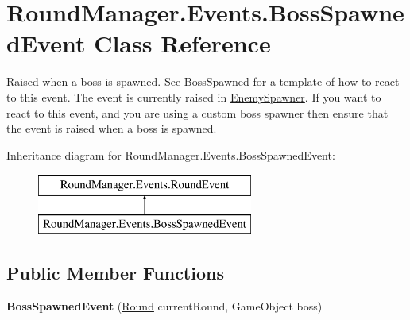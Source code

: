 \hypertarget{class_round_manager_1_1_events_1_1_boss_spawned_event}{}\section{Round\+Manager.\+Events.\+Boss\+Spawned\+Event Class Reference}
\label{class_round_manager_1_1_events_1_1_boss_spawned_event}


Raised when a boss is spawned. See \hyperlink{class_round_manager_1_1_boss_spawned}{Boss\+Spawned} for a template of how to react to this event. The event is currently raised in \hyperlink{class_round_manager_1_1_enemy_spawner}{Enemy\+Spawner}. If you want to react to this event, and you are using a custom boss spawner then ensure that the event is raised when a boss is spawned.  


Inheritance diagram for Round\+Manager.\+Events.\+Boss\+Spawned\+Event\+:\begin{figure}[H]
\begin{center}
\leavevmode
\includegraphics[height=2.000000cm]{class_round_manager_1_1_events_1_1_boss_spawned_event}
\end{center}
\end{figure}
\subsection*{Public Member Functions}
\begin{DoxyCompactItemize}
\item 
\hypertarget{class_round_manager_1_1_events_1_1_boss_spawned_event_a0a7a4896c3de232fdedb5721e7ab0f53}{}{\bfseries Boss\+Spawned\+Event} (\hyperlink{class_round_manager_1_1_round}{Round} current\+Round, Game\+Object boss)\label{class_round_manager_1_1_events_1_1_boss_spawned_event_a0a7a4896c3de232fdedb5721e7ab0f53}

\end{DoxyCompactItemize}
